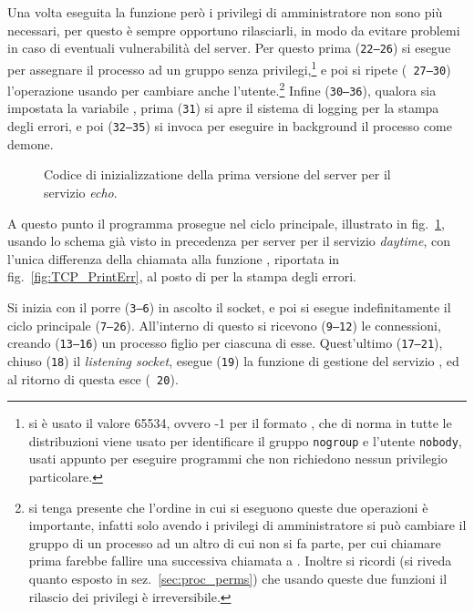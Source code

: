 Una volta eseguita la funzione  però i privilegi di amministratore
non sono più necessari, per questo è sempre opportuno rilasciarli, in modo da
evitare problemi in caso di eventuali vulnerabilità del server.  Per questo
prima (\texttt{\small 22--26}) si esegue  per assegnare il
processo ad un gruppo senza privilegi,\footnote{si è usato il valore 65534,
  ovvero -1 per il formato , che di norma in tutte le
  distribuzioni viene usato per identificare il gruppo \texttt{nogroup} e
  l'utente \texttt{nobody}, usati appunto per eseguire programmi che non
  richiedono nessun privilegio particolare.} e poi si ripete (\texttt{\small
  27--30}) l'operazione usando  per cambiare anche
l'utente.\footnote{si tenga presente che l'ordine in cui si eseguono queste
  due operazioni è importante, infatti solo avendo i privilegi di
  amministratore si può cambiare il gruppo di un processo ad un altro di cui
  non si fa parte, per cui chiamare prima  farebbe fallire una
  successiva chiamata a .  Inoltre si ricordi (si riveda quanto
  esposto in sez.~\ref{sec:proc_perms}) che usando queste due funzioni il
  rilascio dei privilegi è irreversibile.}  Infine (\texttt{\small 30--36}),
qualora sia impostata la variabile , prima (\texttt{\small 31})
si apre il sistema di logging per la stampa degli errori, e poi
(\texttt{\small 32--35}) si invoca  per eseguire in background il
processo come demone.


\begin{figure}[!htb]
  \footnotesize \centering
  \begin{minipage}[c]{\codesamplewidth}
  \end{minipage} 
  \normalsize
  \caption{Codice di inizializzatione della prima versione del server
    per il servizio \textit{echo}.}
  \label{fig:TCP_echo_server_first_main}
\end{figure}

A questo punto il programma prosegue nel ciclo principale, illustrato in
fig.~\ref{fig:TCP_echo_server_first_main}, usando lo schema già visto in
precedenza per server per il servizio \textit{daytime}, con l'unica differenza
della chiamata alla funzione , riportata in
fig.~\ref{fig:TCP_PrintErr}, al posto di  per la stampa degli
errori.

Si inizia con il porre (\texttt{\small 3--6}) in ascolto il socket, e poi si
esegue indefinitamente il ciclo principale (\texttt{\small 7--26}).
All'interno di questo si ricevono (\texttt{\small 9--12}) le connessioni,
creando (\texttt{\small 13--16}) un processo figlio per ciascuna di esse.
Quest'ultimo (\texttt{\small 17--21}), chiuso (\texttt{\small 18}) il
\textit{listening socket}, esegue (\texttt{\small 19}) la funzione di gestione
del servizio , ed al ritorno di questa esce (\texttt{\small
  20}).

